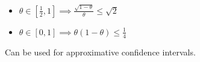 \begin{theorem*}
  \begin{itemize}
    \item \(\theta \in [\frac{1}{2}, 1] \implies \frac{\sqrt{1 - \theta}}{\theta} \leq \sqrt{2}\)
    \item \(\theta \in [0, 1] \implies \theta(1-\theta) \leq \frac{1}{4}\)
  \end{itemize}
  Can be used for approximative confidence intervals.
\end{theorem*}
